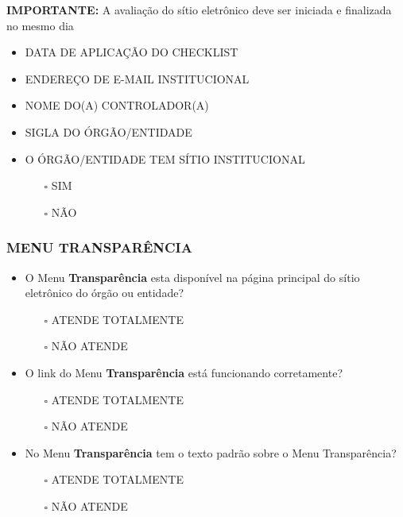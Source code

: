 \documentclass[
]{book}
\providecommand{\tightlist}{%
  \setlength{\itemsep}{0pt}\setlength{\parskip}{0pt}}
\begin{document}
\textbf{IMPORTANTE:} A avaliação do sítio eletrônico deve ser iniciada e finalizada no mesmo dia

\begin{itemize}
\tightlist
\item
  DATA DE APLICAÇÃO DO CHECKLIST
\item
  ENDEREÇO DE E-MAIL INSTITUCIONAL
\item
  NOME DO(A) CONTROLADOR(A)
\item
  SIGLA DO ÓRGÃO/ENTIDADE
\item
  O ÓRGÃO/ENTIDADE TEM SÍTIO INSTITUCIONAL

  \begin{itemize}
  \tightlist
  \item[$\square$]
    SIM
  \item[$\square$]
    NÃO
  \end{itemize}
\end{itemize}

\hypertarget{menu-transparuxeancia-1}{%
\subsubsection*{MENU TRANSPARÊNCIA}\label{menu-transparuxeancia-1}}

\begin{itemize}
\tightlist
\item
  O Menu \textbf{Transparência} esta disponível na página principal do sítio eletrônico do órgão ou entidade?

  \begin{itemize}
  \tightlist
  \item[$\square$]
    ATENDE TOTALMENTE
  \item[$\square$]
    NÃO ATENDE
  \end{itemize}
\item
  O link do Menu \textbf{Transparência} está funcionando corretamente?

  \begin{itemize}
  \tightlist
  \item[$\square$]
    ATENDE TOTALMENTE
  \item[$\square$]
    NÃO ATENDE
  \end{itemize}
\item
  No Menu \textbf{Transparência} tem o texto padrão sobre o Menu Transparência?

  \begin{itemize}
  \tightlist
  \item[$\square$]
    ATENDE TOTALMENTE
  \item[$\square$]
    NÃO ATENDE
  \end{itemize}
\end{itemize}
\end{document}
